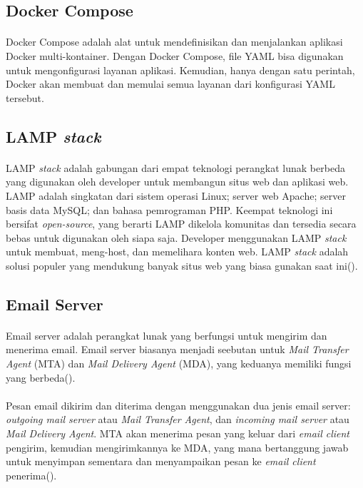 \documentclass[./bab_2.tex]{subfiles}
\begin{document}
  \subsection{Docker Compose}
    \paragraph*{}Docker Compose adalah alat untuk mendefinisikan
    dan menjalankan aplikasi Docker multi-kontainer. Dengan
    Docker Compose, file YAML bisa digunakan untuk mengonfigurasi
    layanan aplikasi. Kemudian, hanya dengan satu perintah, Docker
    akan membuat dan memulai semua layanan dari konfigurasi
    YAML tersebut.

  \subsection{LAMP \textit{stack}}
    \paragraph*{}LAMP \textit{stack} adalah gabungan dari empat
    teknologi perangkat lunak berbeda yang digunakan oleh
    developer untuk membangun situs web dan aplikasi web.
    LAMP adalah singkatan dari sistem operasi Linux; server
    web Apache; server basis data MySQL; dan bahasa
    pemrograman PHP. Keempat teknologi ini bersifat
    \textit{open-source}, yang berarti LAMP dikelola komunitas dan
    tersedia secara bebas untuk digunakan oleh siapa saja.
    Developer menggunakan LAMP \textit{stack} untuk membuat,
    meng-host, dan memelihara konten web. LAMP
    \textit{stack}
    adalah solusi populer yang mendukung banyak situs web
    yang biasa gunakan saat ini(\cite{amazon_lamp}).

  \subsection{Email Server}
    \paragraph*{} Email server adalah perangkat lunak yang
    berfungsi untuk mengirim dan menerima email. Email
    server biasanya menjadi seebutan untuk \textit{Mail
    Transfer Agent} (MTA) dan \textit{Mail Delivery Agent}
    (MDA), yang keduanya memiliki fungsi yang
    berbeda(\cite{cf_email}).

    \paragraph*{} Pesan email dikirim dan diterima dengan
    menggunakan dua jenis email server: \textit{outgoing
    mail server} atau \textit{Mail Transfer Agent}, dan
    \textit{incoming mail server} atau \textit{Mail Delivery
    Agent}. MTA akan menerima pesan yang keluar dari
    \textit{email client} pengirim, kemudian mengirimkannya
    ke MDA, yang mana bertanggung jawab untuk menyimpan
    sementara dan menyampaikan pesan ke \textit{email
    client} penerima(\cite{cf_email}).
\end{document}

